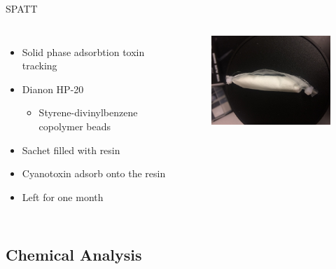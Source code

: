 \begin{frame}{SPATT}

\begin{columns}
	\begin{itemize}
		\item Solid phase adsorbtion toxin tracking 
		\item Dianon HP-20 
		\begin{itemize}
			\item Styrene-divinylbenzene copolymer beads
		\end{itemize} 
		
		\item Sachet filled with resin
		\item Cyanotoxin adsorb onto the resin
		\item Left for one month
	\end{itemize}

	\begin{figure}
		\includegraphics[width=2.3in,angle=-90]{bag.jpg}
	\end{figure}

\end{columns}

\end{frame}


\subsection{Chemical Analysis}

